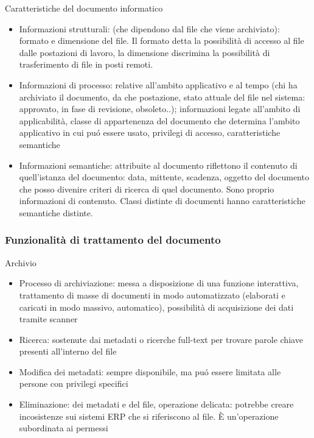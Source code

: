 Caratteristiche del documento informatico

\begin{itemize}

\item
  Informazioni strutturali: (che dipendono dal file che viene
  archiviato): formato e dimensione del file. Il formato detta la
  possibilit\`a di accesso al file dalle postazioni di lavoro, la
  dimensione discrimina la possibilit\`a di trasferimento di file in posti
  remoti.
\item
  Informazioni di processo: relative all'ambito applicativo e al tempo
  (chi ha archiviato il documento, da che postazione, stato attuale del
  file nel sistema: approvato, in fase di revisione, obsoleto..);
  informazioni legate all'ambito di applicabilit\`a, classe di
  appartenenza del documento che determina l'ambito applicativo in cui
  pu\'o essere usato, privilegi di accesso, caratteristiche semantiche
\item
  Informazioni semantiche: attribuite al documento riflettono il
  contenuto di quell'istanza del documento: data, mittente, scadenza,
  oggetto del documento che posso divenire criteri di ricerca di quel
  documento. Sono proprio informazioni di contenuto. Classi distinte di
  documenti hanno caratteristiche semantiche distinte.
\end{itemize}

\subsubsection{Funzionalit\`a di trattamento del
documento}

Archivio

\begin{itemize}

\item
  Processo di archiviazione: messa a disposizione di una funzione
  interattiva, trattamento di masse di documenti in modo automatizzato
  (elaborati e caricati in modo massivo, automatico), possibilit\`a di
  acquisizione dei dati tramite scanner
\item
  Ricerca: sostenute dai metadati o ricerche full-text per trovare
  parole chiave presenti all'interno del file
\item
  Modifica dei metadati: sempre disponibile, ma pu\'o essere limitata alle
  persone con privilegi specifici
\item
  Eliminazione: dei metadati e del file, operazione delicata: potrebbe
  creare incosistenze sui sistemi ERP che si riferiscono al file. È
  un'operazione subordinata ai permessi
\end{itemize}

